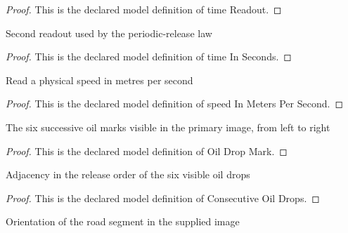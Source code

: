 \begin{proof}
  This is the declared model definition of time Readout.
\end{proof}
\begin{definition}
  \label{def:physics:phyx-mini-0668:phyxminiproblems-problemphyxmini0668-timeinseconds}
  Second readout used by the periodic-release law
\end{definition}
\begin{proof}
  This is the declared model definition of time In Seconds.
\end{proof}
\begin{definition}
  \label{def:physics:phyx-mini-0668:phyxminiproblems-problemphyxmini0668-speedinmeterspersecond}
  Read a physical speed in metres per second
\end{definition}
\begin{proof}
  This is the declared model definition of speed In Meters Per Second.
\end{proof}
\begin{definition}
  \label{def:physics:phyx-mini-0668:phyxminiproblems-problemphyxmini0668-oildropmark}
  The six successive oil marks visible in the primary image, from left to right
\end{definition}
\begin{proof}
  This is the declared model definition of Oil Drop Mark.
\end{proof}
\begin{definition}
  \label{def:physics:phyx-mini-0668:phyxminiproblems-problemphyxmini0668-consecutiveoildrops}
  Adjacency in the release order of the six visible oil drops
\end{definition}
\begin{proof}
  This is the declared model definition of Consecutive Oil Drops.
\end{proof}
\begin{definition}
  \label{def:physics:phyx-mini-0668:phyxminiproblems-problemphyxmini0668-roadorientation}
  Orientation of the road segment in the supplied image
\end{definition}
